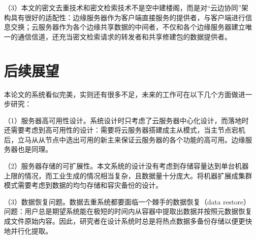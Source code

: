 \documentclass[promaster]{thesis-uestc}
\begin{document}
（3）本文的密文去重技术和密文检索技术不是空中建楼阁，而是对“云边协同”架构具有很好的适配性：边缘服务器作为客户端直接服务的提供者，与客户端进行信息交换；云服务器作为各个边缘共享数据的中间者，不仅和各个边缘服务器建立唯一的通信信道，还充当密文检索请求的转发者和共享修建包的数据提供者。

\section{后续展望}
本论文的系统看似完美，实则还有很多不足，未来的工作可在以下几个方面做进一步研究：

（1）服务器高可用性设计。系统设计时只考虑了云服务器中心化设计，而落地时还需要考虑到高可用性的设计：需要将云服务器搭建成主从模式，当主节点宕机后，立马从从节点中选出可用的新主来保证云服务器的各个功能的高可用。边缘服务器也是同理。

（2）服务器存储的可扩展性。本文系统的设计没有考虑到存储容量达到单台机器上限的情况，而工业生成的情况相当复杂，且数据量十分庞大。将机器扩展成集群模式需要考虑到数据的均匀存储和容灾备份的设计。

（3）数据恢复问题。数据去重系统都要面临一个棘手的数据恢复（data restore）问题：用户总是期望系统能在极短的时间内从容器中提取出数据并按照元数据恢复成文件原始内容。因此，研究者在设计系统时总是将热点数据多备份存储以便更快地并行化提取。

\thesisacknowledgement



\end{document}
